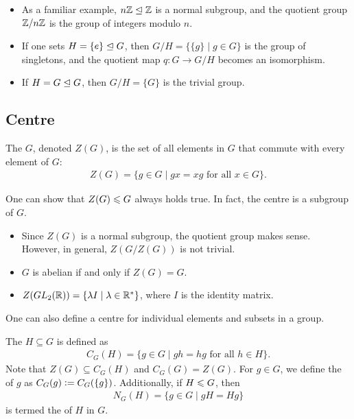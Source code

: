 \begin{example}
    \begin{itemize}
        \item As a familiar example, $n\mathbb{Z} \trianglelefteq \mathbb{Z}$ is a normal subgroup, and the quotient group $\mathbb{Z}/n\mathbb{Z}$ is the group of integers modulo $n$.
        \item If one sets $H = \{e\} \trianglelefteq G$, then $G/H = \{\{g\} \mid g \in G\}$ is the group of singletons, and the quotient map $q:G \to G/H$ becomes an isomorphism.
        \item If $H = G \trianglelefteq G$, then $G/H = \{G\}$ is the trivial group.
    \end{itemize}
\end{example}

\subsection{Centre}

\begin{definition}
    The  $G$, denoted $Z(G)$, is the set of all elements in $G$ that commute with every element of $G$:
    \begin{align}
        Z(G) = \{ g \in G \mid gx = xg \text{ for all } x \in G \}.
    \end{align}
\end{definition}

One can show that $Z(G) \leqslant G$ always holds true. In fact, the centre is a subgroup of $G$.

\begin{example}
    \begin{itemize}
        \item Since $Z(G)$ is a normal subgroup, the quotient group makes sense. However, in general, $Z(G/Z(G))$ is not trivial.
        \item $G$ is abelian if and only if $Z(G) = G$.
        \item $Z(GL_{2}(\mathbb{R})) = \{\lambda I \mid \lambda \in \mathbb{R}^{\ast}\}$, where $I$ is the identity matrix.
    \end{itemize}
\end{example}

One can also define a centre for individual elements and subsets in a group.

\begin{definition}
    The  $H \subseteq G$ is defined as
    \begin{align}
        C_{G}(H) = \{g \in G \mid gh = hg \text{ for all } h \in H\}.
    \end{align}
    Note that $Z(G) \subseteq C_{G}(H)$ and $C_{G}(G) = Z(G)$. For $g \in G$, we define the  of $g$ as $C_{G}(g) \vcentcolon= C_{G}(\{g\})$. Additionally, if $H \leqslant G$, then
    \begin{align}
        N_{G}(H) = \{g \in G \mid gH = Hg\}
    \end{align}
    is termed the  of $H$ in $G$.
\end{definition}

